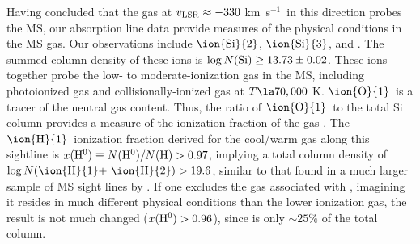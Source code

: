 \documentclass[12pt,preprint]{aastex6}
\newcommand{\HI}{\ensuremath{\mbox{\ion{H}{1}}}}
\newcommand{\OI}{\ensuremath{\mbox{\ion{O}{1}}}}
\newcommand{\SiII}{\ensuremath{\mbox{\ion{Si}{2}}}}
\newcommand{\SiIII}{\ensuremath{\mbox{\ion{Si}{3}}}}
\newcommand{\kms}{km~s$^{-1}$}
\newcommand{\vlsr}{\ensuremath{v_{\rm LSR}\relax}}
\begin{document}
Having concluded that the gas at $\vlsr \approx -330$ \kms\ in this
direction probes the MS, our absorption line data provide measures of
the physical conditions in the MS gas. Our observations include \SiII,
\SiIII, and . The summed column density of these ions is
$\log N({\rm Si}) \ge 13.73\pm0.02$. These ions together probe the
low- to moderate-ionization gas in the MS, including photoionized gas
and collisionally-ionized gas at $T \la 70,000$ K. \OI\ is a tracer of
the neutral gas content. Thus, the ratio of \OI\ to the total Si
column provides a measure of the ionization fraction of the gas
\citep[see ][]{lehner2015}. The \HI\ ionization fraction derived for
the cool/warm gas along this sightline is
$x({\rm H}^0) \equiv N({\rm H}^0)/N({\rm H}) > 0.97$, implying a total
column density of $\log N(\mbox{\HI + \ion{H}{2}}) > 19.6$, similar to
that found in a much larger sample of MS sight lines by
\citet{fox2014}. If one excludes the gas associated with ,
imagining it resides in much different physical conditions than the
lower ionization gas, the result is not much changed
($x({\rm H}^0) > 0.96$), since  is only $\sim25\%$ of the
total column.





\pagebreak
\clearpage
















\end{document}
